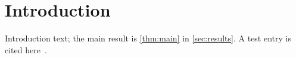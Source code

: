 \section{Introduction}
\label{sec:introduction}

Introduction text; the main result is \cref{thm:main} in \cref{sec:results}.
A test entry is cited here~\citep{Test2026Package}.

